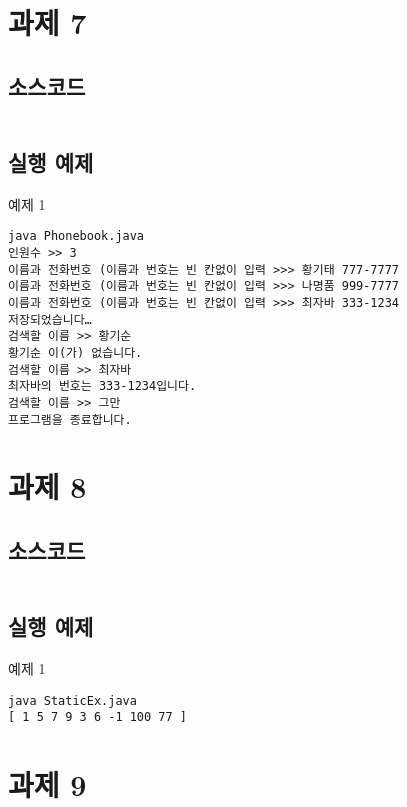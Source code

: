 \documentclass{article}
\theoremstyle{nonumberplain}
\begin{document}
\section{과제 7}
\subsection{소스코드}
\begin{code}
\inputminted{java}{java/Prob7/Phonebook.java}
\end{code}
\subsection{실행 예제}
예제 1
\begin{code}
\begin{verbatim}
java Phonebook.java
인원수 >> 3
이름과 전화번호 (이름과 번호는 빈 칸없이 입력 >>> 황기태 777-7777
이름과 전화번호 (이름과 번호는 빈 칸없이 입력 >>> 나명품 999-7777
이름과 전화번호 (이름과 번호는 빈 칸없이 입력 >>> 최자바 333-1234
저장되었습니다…
검색할 이름 >> 황기순
황기순 이(가) 없습니다.
검색할 이름 >> 최자바
최자바의 번호는 333-1234입니다.
검색할 이름 >> 그만
프로그램을 종료합니다.
\end{verbatim}
\end{code}



\section{과제 8}
\subsection{소스코드}
\begin{code}
\inputminted{java}{java/Prob8/StaticEx.java}
\end{code}
\subsection{실행 예제}
예제 1
\begin{code}
\begin{verbatim}
java StaticEx.java
[ 1 5 7 9 3 6 -1 100 77 ]
\end{verbatim}
\end{code}



\section{과제 9}
\end{document}
